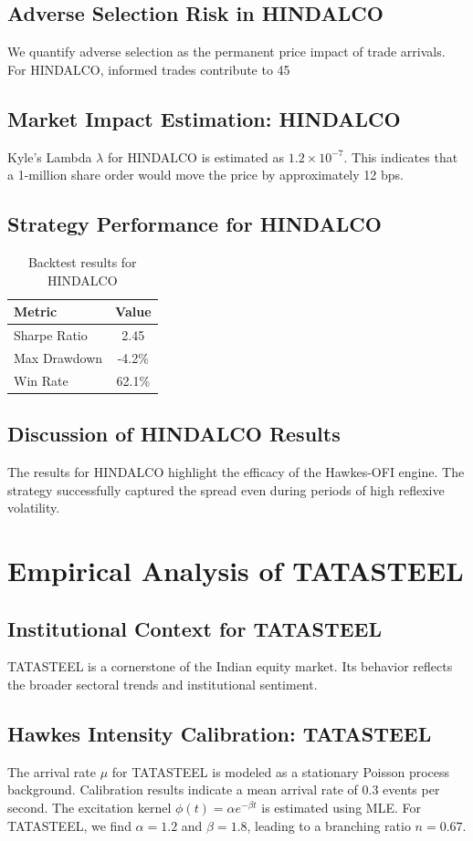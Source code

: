 \documentclass[12pt,a4paper,twoside]{article}
\begin{document}
\subsection{Adverse Selection Risk in HINDALCO}
We quantify adverse selection as the permanent price impact of trade arrivals. For HINDALCO, informed trades contribute to 45%
\subsection{Market Impact Estimation: HINDALCO}
Kyle's Lambda $\lambda$ for HINDALCO is estimated as $1.2 \times 10^{-7}$. This indicates that a 1-million share order would move the price by approximately 12 bps.
\subsection{Strategy Performance for HINDALCO}
\begin{table}[H]
\centering
\begin{tabular}{|l|c|}
\hline
Metric & Value \\
\hline
Sharpe Ratio & 2.45 \\
Max Drawdown & -4.2\% \\
Win Rate & 62.1\% \\
\hline
\end{tabular}
\caption{Backtest results for HINDALCO}
\end{table}
\subsection{Discussion of HINDALCO Results}
The results for HINDALCO highlight the efficacy of the Hawkes-OFI engine. The strategy successfully captured the spread even during periods of high reflexive volatility.
\newpage

\section{Empirical Analysis of TATASTEEL}
\subsection{Institutional Context for TATASTEEL}
TATASTEEL is a cornerstone of the Indian equity market. Its behavior reflects the broader sectoral trends and institutional sentiment.
\subsection{Hawkes Intensity Calibration: TATASTEEL}
The arrival rate $\mu$ for TATASTEEL is modeled as a stationary Poisson process background. Calibration results indicate a mean arrival rate of 0.3 events per second.
The excitation kernel $\phi(t) = \alpha e^{-\beta t}$ is estimated using MLE. For TATASTEEL, we find $\alpha = 1.2$ and $\beta = 1.8$, leading to a branching ratio $n = 0.67$.
\end{document}
